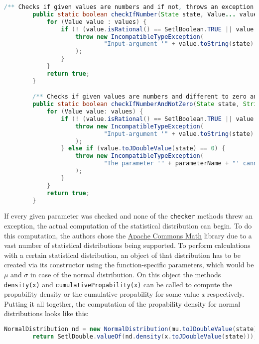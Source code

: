  \newpage
 \begin{center}
	\begin{lstlisting}[caption={Checker methods}, language={java}, label=lis:checkerMethods]
		/** Checks if given values are numbers and if not, throws an exception */
		public static boolean checkIfNumber(State state, Value... values) throws IncompatibleTypeException {
			for (Value value : values) {
				if (! (value.isRational() == SetlBoolean.TRUE || value.isDouble() == SetlBoolean.TRUE)) {
					throw new IncompatibleTypeException(
							"Input-argument '" + value.toString(state) + "' is not a number."
					);
				}
			}
			return true;
		}

		/** Checks if given values are numbers and different to zero and if not, throws an exception */
		public static boolean checkIfNumberAndNotZero(State state, String parameterName, Value... values) throws SetlException{
			for (Value value: values) {
				if (! (value.isRational() == SetlBoolean.TRUE || value.isDouble() == SetlBoolean.TRUE)) {
					throw new IncompatibleTypeException(
							"Input-argument '" + value.toString(state) + "' is not a number."
					);
				} else if (value.toJDoubleValue(state) == 0) {
					throw new IncompatibleTypeException(
							"The parameter '" + parameterName + "' cannot be zero."
					);
				}
			}
			return true;
		}
	\end{lstlisting}
\end{center}

If every given parameter was checked and none of the \lstinline{checker} methods threw an exception, the actual computation of the statistical distribution can begin. To do this computation, the authors chose the \href{http://commons.apache.org/proper/commons-math/userguide/distribution.html}{Apache Commons Math} library due to a vast number of statistical distributions being supported. To perform calculations with a certain statistical distribution, an object of that distribution has to be created via its constructor using the function-specific parameters, which would be $\mu$ and $\sigma$ in case of the normal distribution. On this object the methods \lstinline{density(x)} and \lstinline{cumulativePropability(x)} can be called to compute the propability density or the cumulative propability for some value \textit{x} respectively. Putting it all together, the computation of the propability density for normal distributions looks like this:

\begin{center}
	\begin{lstlisting}[caption={Normal Distribution propability density computation}, language={java}, label=lis:densityComputation]
		NormalDistribution nd = new NormalDistribution(mu.toJDoubleValue(state), sigma.toJDoubleValue(state));
        return SetlDouble.valueOf(nd.density(x.toJDoubleValue(state)));
	\end{lstlisting}
\end{center}

